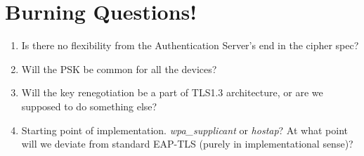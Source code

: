 \documentclass[12pt]{article}
\begin{document}
\section{Burning Questions!}

\begin{enumerate}
	\item{Is there no flexibility from the Authentication Server's end in the cipher spec?}
	\item{Will the PSK be common for all the devices?}
	\item{Will the key renegotiation be a part of TLS1.3 architecture, or are we supposed to do something else?}
	\item{Starting point of implementation. \emph{wpa\_supplicant} or \emph{hostap}? At what point will we deviate from standard EAP-TLS (purely in implementational sense)?}
	
\end{enumerate}
\end{document}
